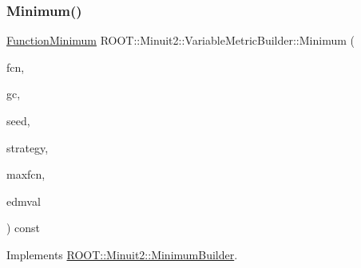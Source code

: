 \mbox{\label{classROOT_1_1Minuit2_1_1VariableMetricBuilder_a56d18a37b8643611ff80875b91915784}} 
\subsubsection{\texorpdfstring{Minimum()}{Minimum()}\hspace{0.1cm}{\footnotesize\ttfamily [1/6]}}
{\footnotesize\ttfamily \mbox{\hyperlink{classROOT_1_1Minuit2_1_1FunctionMinimum}{Function\+Minimum}} R\+O\+O\+T\+::\+Minuit2\+::\+Variable\+Metric\+Builder\+::\+Minimum (\begin{DoxyParamCaption}\item[{const \mbox{\hyperlink{classROOT_1_1Minuit2_1_1MnFcn}{Mn\+Fcn}} \&}]{fcn,  }\item[{const \mbox{\hyperlink{classROOT_1_1Minuit2_1_1GradientCalculator}{Gradient\+Calculator}} \&}]{gc,  }\item[{const \mbox{\hyperlink{classROOT_1_1Minuit2_1_1MinimumSeed}{Minimum\+Seed}} \&}]{seed,  }\item[{const \mbox{\hyperlink{classROOT_1_1Minuit2_1_1MnStrategy}{Mn\+Strategy}} \&}]{strategy,  }\item[{unsigned int}]{maxfcn,  }\item[{double}]{edmval }\end{DoxyParamCaption}) const\hspace{0.3cm}{\ttfamily [virtual]}}



Implements \mbox{\hyperlink{classROOT_1_1Minuit2_1_1MinimumBuilder_aefaa624436afa8195af1f3393a35981f}{R\+O\+O\+T\+::\+Minuit2\+::\+Minimum\+Builder}}.

